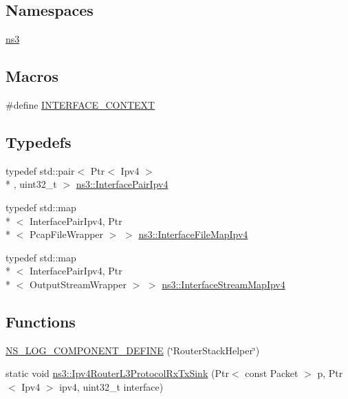 \subsection*{Namespaces}
\begin{DoxyCompactItemize}
\item 
\hyperlink{namespacens3}{ns3}
\end{DoxyCompactItemize}
\subsection*{Macros}
\begin{DoxyCompactItemize}
\item 
\#define \hyperlink{router-stack-helper_8cc_a7db88cb02fe5c738db27431496b7131e}{I\-N\-T\-E\-R\-F\-A\-C\-E\-\_\-\-C\-O\-N\-T\-E\-X\-T}
\end{DoxyCompactItemize}
\subsection*{Typedefs}
\begin{DoxyCompactItemize}
\item 
typedef std\-::pair$<$ Ptr$<$ Ipv4 $>$\\*
, uint32\-\_\-t $>$ \hyperlink{namespacens3_a83e2603870381affabd5ca766d17daff}{ns3\-::\-Interface\-Pair\-Ipv4}
\item 
typedef std\-::map\\*
$<$ Interface\-Pair\-Ipv4, Ptr\\*
$<$ Pcap\-File\-Wrapper $>$ $>$ \hyperlink{namespacens3_ab14a5629528234e6f76ad3bb180022fe}{ns3\-::\-Interface\-File\-Map\-Ipv4}
\item 
typedef std\-::map\\*
$<$ Interface\-Pair\-Ipv4, Ptr\\*
$<$ Output\-Stream\-Wrapper $>$ $>$ \hyperlink{namespacens3_a5634ac4e27d952132fba4cd906d4ebd3}{ns3\-::\-Interface\-Stream\-Map\-Ipv4}
\end{DoxyCompactItemize}
\subsection*{Functions}
\begin{DoxyCompactItemize}
\item 
\hyperlink{router-stack-helper_8cc_ab2435b2b13a2f2a29451f2630b953daf}{N\-S\-\_\-\-L\-O\-G\-\_\-\-C\-O\-M\-P\-O\-N\-E\-N\-T\-\_\-\-D\-E\-F\-I\-N\-E} (\char`\"{}Router\-Stack\-Helper\char`\"{})
\item 
static void \hyperlink{namespacens3_acde124208ae741ae241b61b9a22ead8d}{ns3\-::\-Ipv4\-Router\-L3\-Protocol\-Rx\-Tx\-Sink} (Ptr$<$ const Packet $>$ p, Ptr$<$ Ipv4 $>$ ipv4, uint32\-\_\-t interface)
\end{DoxyCompactItemize}
